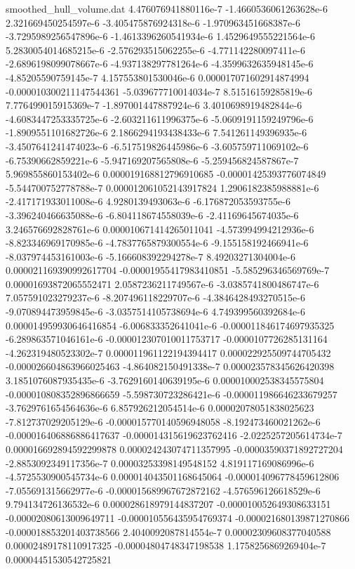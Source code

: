 \begin{filecontents}{smoothed_hull_volume.dat}
4.476076941880116e-7	-1.4660536061263628e-6	2.321669450254597e-6	-3.405475876924318e-6	-1.970963451668387e-6	-3.7295989256547896e-6	-1.4613396260541934e-6	1.4529649555221564e-6	5.2830054014685215e-6	-2.576293515062255e-6	-4.771142280097411e-6	-2.6896198099078667e-6	-4.937138297781264e-6	-4.3599632635948145e-6	-4.85205590759145e-7	4.157553801530046e-6	0.000017071602914874994	-0.000010300211147544361	-5.039677710014034e-7	8.51516159285819e-6
7.776499015915369e-7	-1.897001447887924e-6	3.4010698919482844e-6	-4.6083447253335725e-6	-2.603211611996375e-6	-5.0609191159249796e-6	-1.8909551101682726e-6	2.1866294193438433e-6	7.541261149396935e-6	-3.4507641241474023e-6	-6.517519826445986e-6	-3.605759711069102e-6	-6.75390662859221e-6	-5.947169207565808e-6	-5.259456824587867e-7	5.969855860153402e-6	0.000019168812796910685	-0.00001425393776074849	-5.544700752778788e-7	0.000012061052143917824
1.2906182385988881e-6	-2.417171933011008e-6	4.9280139493063e-6	-6.176872053593755e-6	-3.396240466635088e-6	-6.804118674558039e-6	-2.41169645674035e-6	3.246576692828761e-6	0.000010671414265011041	-4.573994994212936e-6	-8.823346969170985e-6	-4.7837765879300554e-6	-9.155158192466941e-6	-8.037974453161003e-6	-5.166608392294278e-7	8.49203271304004e-6	0.000021169390992617704	-0.00001955417983410851	-5.585296346569769e-7	0.00001693872065552471
2.0587236211749567e-6	-3.0385741800486747e-6	7.057591023279237e-6	-8.207496118229707e-6	-4.3846428493270515e-6	-9.070894473959845e-6	-3.0357514105738694e-6	4.749399560392684e-6	0.000014959930646416854	-6.006833352641041e-6	-0.000011846174697935325	-6.289863571046161e-6	-0.000012307010011753717	-0.0000107726285131164	-4.262319480523302e-7	0.000011961122194394417	0.000022925509744705432	-0.000026604863966025463	-4.864082150491338e-7	0.000023578345626420398
3.1851076087935435e-6	-3.7629160140639195e-6	0.000010002538345575804	-0.000010808352896866659	-5.598730723286421e-6	-0.000011986646233679257	-3.7629761654564636e-6	6.857926212054514e-6	0.00002078051838025623	-7.812737029205129e-6	-0.000015770140596948058	-8.192473460021262e-6	-0.000016406886886417637	-0.000014315619623762416	-2.0225257205614734e-7	0.000016692894592299878	0.000024243074711357995	-0.00003590371892727204	-2.8853092349117356e-7	0.00003253398149548152
4.819117169086996e-6	-4.5725530900545734e-6	0.000014043501168645064	-0.000014096778459612806	-7.055691315662977e-6	-0.000015689967672872162	-4.576596126618529e-6	9.794134726136532e-6	0.000028618979144837207	-0.000010052649308633151	-0.00002080613009649711	-0.000010556435954769374	-0.000021680139871270866	-0.000018853201403738566	2.4040092087814554e-7	0.00002309608377040588	0.00002489178110917325	-0.00004804748347198538	1.1758256869269404e-7	0.00004451530542725821

\end{filecontents}
